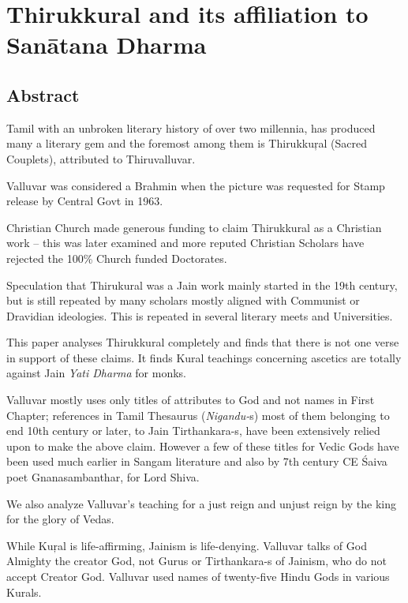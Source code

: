 
\chapter{Thirukkural and its affiliation to Sanātana Dharma}\label{chap04}



\section*{Abstract}

Tamil with an unbroken literary history of over two millennia, has produced many a literary gem and the foremost among them is Thirukkuŗal (Sacred Couplets), attributed to Thiruvalluvar.

Valluvar was considered a Brahmin when the picture was requested for Stamp release by Central Govt in 1963.

Christian Church made generous funding to claim Thirukkural as a Christian work – this was later examined and more reputed Christian Scholars have rejected the 100\% Church funded Doctorates.

Speculation that Thirukural was a Jain work mainly started in the 19th century, but is still repeated by many scholars mostly aligned with Communist or Dravidian ideologies. This is repeated in several literary meets and Universities.

This paper analyses Thirukkural completely and finds that there is not one verse in support of these claims. It finds Kural teachings concerning ascetics are totally against Jain \textit{Yati Dharma} for monks.

Valluvar mostly uses only titles of attributes to God and not names in First Chapter; references in Tamil Thesaurus (\textit{Nigandu-}s) most of them belonging to end 10th century or later, to Jain Tirthankara-s, have been extensively relied upon to make the above claim. However a few of these titles for Vedic Gods have been used much earlier in Sangam literature and also by 7th century CE Śaiva poet Gnanasambanthar, for Lord Shiva.

We also analyze Valluvar’s teaching for a just reign and unjust reign by the king for the glory of Vedas.

While Kuŗal is life-affirming, Jainism is life-denying. Valluvar talks of God Almighty the creator God, not Gurus or Tirthankara-s of Jainism, who do not accept Creator God. Valluvar used names of twenty-five Hindu Gods in various Kurals.

